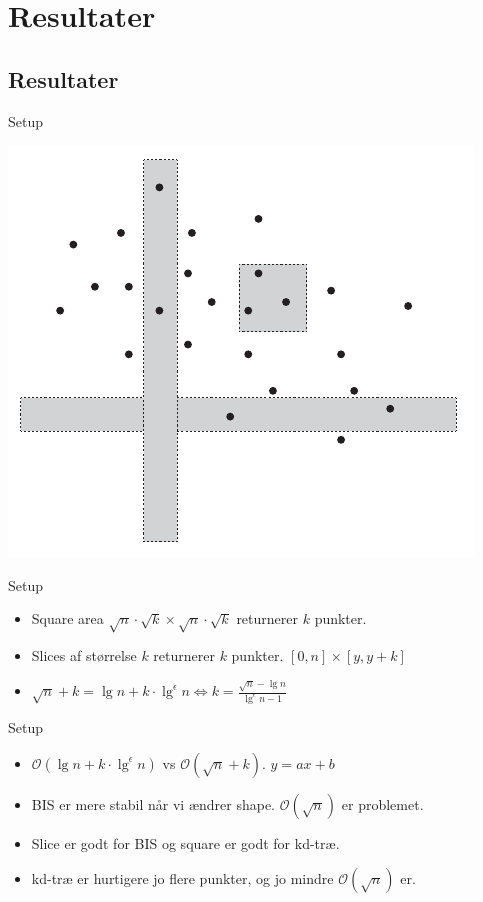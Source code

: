 \documentclass[pdf]{beamer}
\begin{document}
\section{Resultater}
\subsection{Resultater}

\begin{frame}{Setup}
  \begin{center}
    \includegraphics{pictures/felter.pdf}
  \end{center}
\end{frame}

\begin{frame}{Setup}
  \begin{itemize}
    \item Square area $\sqrt{n}\cdot\sqrt{k}\times\sqrt{n}\cdot\sqrt{k}$ returnerer $k$ punkter.
    \item Slices af størrelse $k$ returnerer $k$ punkter. $[0,n] \times [y, y+k]$
    \item $\sqrt{n}+k = \lg n + k\cdot\lg^\epsilon n \Leftrightarrow k = \frac{\sqrt{n}-\lg n}{\lg^\epsilon n -1}$
  \end{itemize}
\end{frame}

\begin{frame}{Setup}
      \begin{itemize}
        \item $\mathcal{O}(\lg n + k\cdot\lg^\epsilon n)$ vs $\mathcal{O}(\sqrt{n} + k)$. $y = ax + b$
        \item BIS er mere stabil når vi ændrer shape. $\mathcal{O}(\sqrt{n})$ er problemet.
        \item Slice er godt for BIS og square er godt for kd-træ.
        \item kd-træ er hurtigere jo flere punkter, og jo mindre $\mathcal{O}(\sqrt{n})$ er.
      \end{itemize}
\end{frame}
\end{document}
